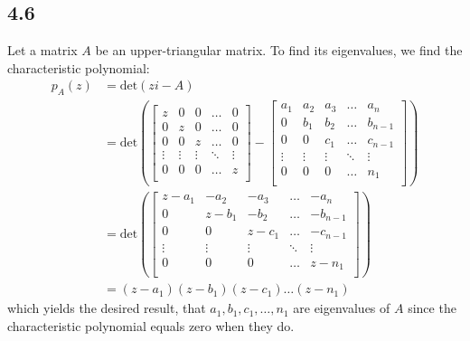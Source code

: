 \documentclass[letterpaper,12pt]{article}
\theoremstyle{definition}
\begin{document}
\subsection*{4.6}
Let a matrix $A$ be an upper-triangular matrix. To find its eigenvalues, we find the characteristic polynomial:
\begin{align*}
p_A(z) &= \text{det}(zi - A)\\
&= \text{det}\left(
\begin{bmatrix}
    z & 0 & 0 & \dots & 0 \\
    0 & z & 0 & \dots & 0 \\
    0 & 0 & z & \dots & 0 \\
    \vdots & \vdots & \vdots & \ddots & \vdots \\
    0 & 0 & 0 & \dots & z \\
\end{bmatrix}
-
\begin{bmatrix}
    a_1 & a_2 & a_3 & \dots & a_n \\
    0 & b_1 & b_2 & \dots & b_{n-1} \\
    0 & 0 & c_1 & \dots & c_{n-1}\\
    \vdots & \vdots & \vdots & \ddots & \vdots \\
    0 & 0 & 0 & \dots & n_1 \\
\end{bmatrix}\right)\\
&= 
\text{det}\left(
\begin{bmatrix}
    z - a_1 & -a_2 & -a_3 & \dots &- a_n \\
    0 & z - b_1 & -b_2 & \dots & -b_{n-1} \\
    0 & 0 & z - c_1 & \dots &  -c_{n-1}\\
    \vdots & \vdots & \vdots & \ddots & \vdots \\
    0 & 0 & 0 & \dots & z - n_1 \\
\end{bmatrix}\right)\\
&= 
(z-a_1)(z-b_1)(z-c_1)\dots(z-n_1)
\end{align*}
which yields the desired result, that $a_1, b_1, c_1,\dots, n_1$ are eigenvalues of $A$ since the characteristic polynomial equals zero when they do.
\end{document}
